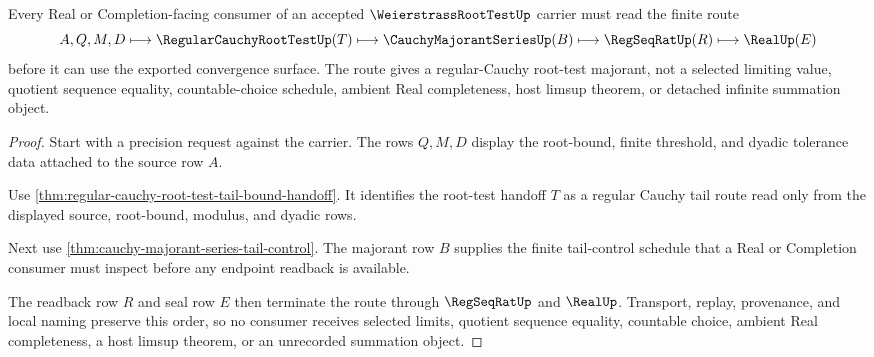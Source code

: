 \begin{theorem}
\label{thm:weierstrass-root-test-tail-majorant}
Every Real or Completion-facing consumer of an accepted $\WeierstrassRootTestUp$ carrier must read the finite route
$$
A,Q,M,D \longmapsto \RegularCauchyRootTestUp(T) \longmapsto \CauchyMajorantSeriesUp(B) \longmapsto \RegSeqRatUp(R) \longmapsto \RealUp(E)
$$
before it can use the exported convergence surface. The route gives a regular-Cauchy root-test majorant, not a selected limiting value, quotient sequence equality, countable-choice schedule, ambient Real completeness, host limsup theorem, or detached infinite summation object.
\end{theorem}
\begin{proof}
Start with a precision request against the carrier. The rows $Q,M,D$ display the root-bound, finite threshold, and dyadic tolerance data attached to the source row $A$.

Use \autoref{thm:regular-cauchy-root-test-tail-bound-handoff}. It identifies the root-test handoff $T$ as a regular Cauchy tail route read only from the displayed source, root-bound, modulus, and dyadic rows.

Next use \autoref{thm:cauchy-majorant-series-tail-control}. The majorant row $B$ supplies the finite tail-control schedule that a Real or Completion consumer must inspect before any endpoint readback is available.

The readback row $R$ and seal row $E$ then terminate the route through $\RegSeqRatUp$ and $\RealUp$. Transport, replay, provenance, and local naming preserve this order, so no consumer receives selected limits, quotient sequence equality, countable choice, ambient Real completeness, a host limsup theorem, or an unrecorded summation object.
\end{proof}



